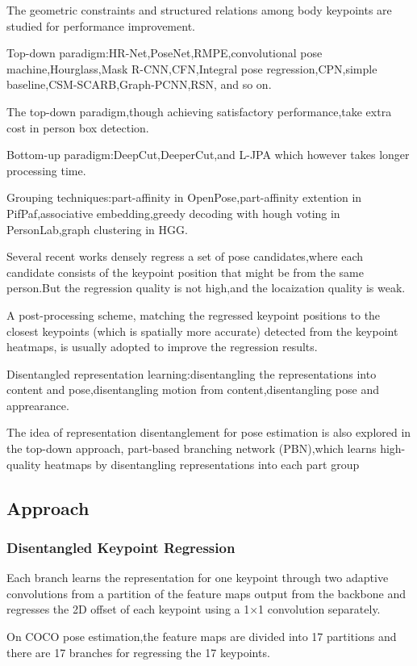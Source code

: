\documentclass[11pt]{article}
\begin{document}
The geometric constraints and structured relations among body keypoints are studied for performance improvement.

Top-down paradigm:HR-Net,PoseNet,RMPE,convolutional pose machine,Hourglass,Mask R-CNN,CFN,Integral pose regression,CPN,simple baseline,CSM-SCARB,Graph-PCNN,RSN, and so on.

The top-down paradigm,though achieving satisfactory performance,take extra cost in person box detection.

Bottom-up paradigm:DeepCut,DeeperCut,and L-JPA which however takes longer processing time.

Grouping techniques:part-affinity in OpenPose,part-affinity extention in PifPaf,associative embedding,greedy decoding with hough voting in PersonLab,graph clustering in HGG.

Several recent works densely regress a set of pose candidates,where each candidate consists of the keypoint position that might be from the same person.But the regression quality is not high,and the locaization quality is weak.

A post-processing scheme, matching the regressed keypoint positions to the closest keypoints
(which is spatially more accurate) detected from the keypoint heatmaps, is usually adopted to improve the regression results.

Disentangled representation learning:disentangling the representations into content and pose,disentangling motion from content,disentangling pose and apprearance.

The idea of representation disentanglement for pose estimation is also explored in the top-down approach, part-based branching network (PBN),which learns high-quality heatmaps by disentangling representations into each part group
\subsection{Approach}
\subsubsection{Disentangled Keypoint Regression}
Each branch learns the representation for one keypoint through two adaptive convolutions from a partition of the feature maps output from the backbone and regresses the 2D offset of each keypoint using a 1×1 convolution separately.

On COCO pose estimation,the feature maps are divided into 17 partitions and there are 17 branches for regressing the 17 keypoints.
\end{document}
